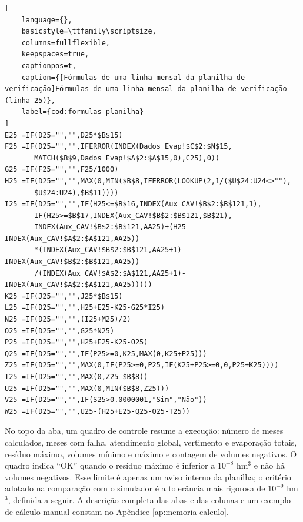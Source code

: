 \noindent\begin{minipage}{\linewidth}
\begin{lstlisting}[
    language={},
    basicstyle=\ttfamily\scriptsize,
    columns=fullflexible,
    keepspaces=true,
    captionpos=t,
    caption={[Fórmulas de uma linha mensal da planilha de verificação]Fórmulas de uma linha mensal da planilha de verificação (linha 25)},
    label={cod:formulas-planilha}
]
E25 =IF(D25="","",D25*$B$15)
F25 =IF(D25="","",IFERROR(INDEX(Dados_Evap!$C$2:$N$15,
       MATCH($B$9,Dados_Evap!$A$2:$A$15,0),C25),0))
G25 =IF(F25="","",F25/1000)
H25 =IF(D25="","",MAX(0,MIN($B$8,IFERROR(LOOKUP(2,1/($U$24:U24<>""),
       $U$24:U24),$B$11))))
I25 =IF(D25="","",IF(H25<=$B$16,INDEX(Aux_CAV!$B$2:$B$121,1),
       IF(H25>=$B$17,INDEX(Aux_CAV!$B$2:$B$121,$B$21),
       INDEX(Aux_CAV!$B$2:$B$121,AA25)+(H25-INDEX(Aux_CAV!$A$2:$A$121,AA25))
       *(INDEX(Aux_CAV!$B$2:$B$121,AA25+1)-INDEX(Aux_CAV!$B$2:$B$121,AA25))
       /(INDEX(Aux_CAV!$A$2:$A$121,AA25+1)-INDEX(Aux_CAV!$A$2:$A$121,AA25)))))
K25 =IF(J25="","",J25*$B$15)
L25 =IF(D25="","",H25+E25-K25-G25*I25)
N25 =IF(D25="","",(I25+M25)/2)
O25 =IF(D25="","",G25*N25)
P25 =IF(D25="","",H25+E25-K25-O25)
Q25 =IF(D25="","",IF(P25>=0,K25,MAX(0,K25+P25)))
Z25 =IF(D25="","",MAX(0,IF(P25>=0,P25,IF(K25+P25>=0,0,P25+K25))))
T25 =IF(D25="","",MAX(0,Z25-$B$8))
U25 =IF(D25="","",MAX(0,MIN($B$8,Z25)))
V25 =IF(D25="","",IF(S25>0.0000001,"Sim","Não"))
W25 =IF(D25="","",U25-(H25+E25-Q25-O25-T25))
\end{lstlisting}
\end{minipage}
\par\medskip

No topo da aba, um quadro de controle resume a execução: número de meses calculados, meses com falha, atendimento global, vertimento e evaporação totais, resíduo máximo, volumes mínimo e máximo e contagem de volumes negativos. O quadro indica ``OK'' quando o resíduo máximo é inferior a $10^{-8}$ hm$^3$ e não há volumes negativos. Esse limite é apenas um aviso interno da planilha; o critério adotado na comparação com o simulador é a tolerância mais rigorosa de $10^{-9}$ hm$^3$, definida a seguir. A descrição completa das abas e das colunas e um exemplo de cálculo manual constam no Apêndice \ref{ap:memoria-calculo}.

